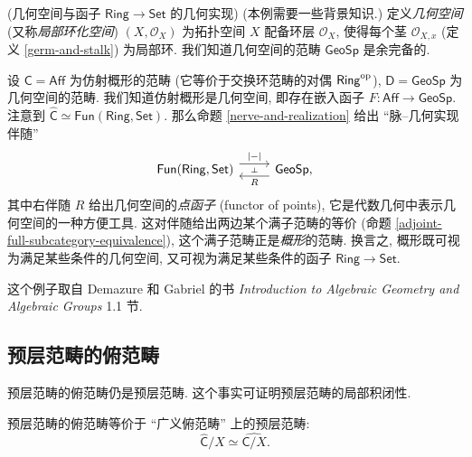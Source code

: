 \begin{example}
	{(几何空间与函子 $\mathsf {Ring}\to\mathsf {Set}$ 的几何实现)}
	{\small (本例需要一些背景知识.)} 定义\emph{几何空间} (又称\emph{局部环化空间}) $(X,\mathcal O_X)$ 为拓扑空间 $X$ 配备环层 $\mathcal O_X$, 使得每个茎 $\mathcal O_{X,x}$ (定义 \ref{germ-and-stalk}) 为局部环.
	我们知道几何空间的范畴 $\mathsf {GeoSp}$ 是余完备的.
	
	设 $\mathsf C = \mathsf {Aff}$ 为仿射概形的范畴 (它等价于交换环范畴的对偶 $\mathsf {Ring}^{\text{op}}$), $\mathsf D = \mathsf {GeoSp}$ 为几何空间的范畴.
	我们知道仿射概形是几何空间, 即存在嵌入函子 $F\colon \mathsf {Aff}\to\mathsf {GeoSp}$.
	注意到 $\widehat {\mathsf C} \simeq \mathsf {Fun}(\mathsf {Ring},\mathsf {Set})$.
	那么命题 \ref{nerve-and-realization} 给出 ``脉--几何实现伴随''
	\[\begin{tikzcd}[ampersand replacement=\&]
		{\mathsf {Fun}(\mathsf {Ring},\mathsf {Set})} \& {\mathsf {GeoSp},}
		\arrow[""{name=0, anchor=center, inner sep=0}, "|{-}|", shift left=2, from=1-1, to=1-2]
		\arrow[""{name=1, anchor=center, inner sep=0}, "R", shift left=2, from=1-2, to=1-1]
		\arrow["\dashv"{anchor=center, rotate=-90}, draw=none, from=0, to=1]
	\end{tikzcd}\]
	其中右伴随 $R$ 给出几何空间的\emph{点函子} (functor of points), 它是代数几何中表示几何空间的一种方便工具.
	这对伴随给出两边某个满子范畴的等价 (命题 \ref{adjoint-full-subcategory-equivalence}), 这个满子范畴正是\emph{概形}的范畴. 换言之, 概形既可视为满足某些条件的几何空间, 又可视为满足某些条件的函子 $\mathsf {Ring}\to\mathsf {Set}$.
	
	这个例子取自 Demazure 和 Gabriel 的书 \emph{Introduction to Algebraic Geometry and Algebraic Groups} 1.1 节.
\end{example}

\subsection{预层范畴的俯范畴}

预层范畴的俯范畴仍是预层范畴. 这个事实可证明预层范畴的局部积闭性.

\begin{prop}
	{}
	预层范畴的俯范畴等价于 ``广义俯范畴'' 上的预层范畴:
	$$
	\widehat {\mathsf C}/X \simeq \widehat {\mathsf C / X}.
	$$
\end{prop}

